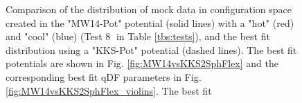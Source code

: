 \begin{figure}
\caption{Comparison of the distribution of mock data in configuration space created in the "MW14-Pot" potential (solid lines) with a "hot" (red) and "cool" (blue) \MAP (Test \textcircled{8} in Table \ref{tbs:tests}), and the best fit distribution using a "KKS-Pot" potential (dashed lines). The best fit potentials are shown in Fig. \ref{fig:MW14vsKKS2SphFlex} and the corresponding best fit qDF parameters in Fig. \ref{fig:MW14vsKKS2SphFlex_violins}. The best fit }
\label{fig:MW14vsKKS2SphFlex_mockdata_residuals}
\end{figure}







